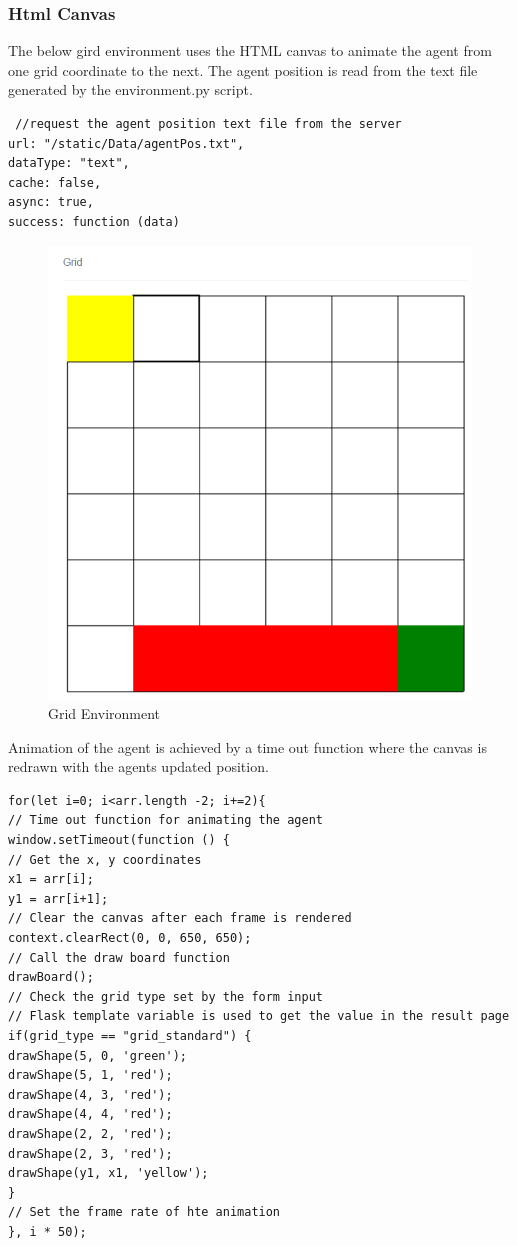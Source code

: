 \subsubsection{Html Canvas}
The below gird environment uses the HTML canvas to animate the agent from one grid coordinate to the next. The agent position is read from the text file generated by the environment.py script.
\begin{verbatim}
 //request the agent position text file from the server
url: "/static/Data/agentPos.txt",
dataType: "text",
cache: false,
async: true,
success: function (data)
\end{verbatim}
\begin{figure}[H]
	\centering
	\includegraphics[width=.7\linewidth]{img/grid}
	\caption{Grid Environment}
	\label{fig:grid}
\end{figure}
Animation of the agent is achieved by a time out function where the canvas is redrawn with the agents updated position.
\begin{verbatim}
for(let i=0; i<arr.length -2; i+=2){
// Time out function for animating the agent
window.setTimeout(function () {
// Get the x, y coordinates
x1 = arr[i];
y1 = arr[i+1];
// Clear the canvas after each frame is rendered
context.clearRect(0, 0, 650, 650);
// Call the draw board function
drawBoard();
// Check the grid type set by the form input
// Flask template variable is used to get the value in the result page
if(grid_type == "grid_standard") {
drawShape(5, 0, 'green');
drawShape(5, 1, 'red');
drawShape(4, 3, 'red');
drawShape(4, 4, 'red');
drawShape(2, 2, 'red');
drawShape(2, 3, 'red');
drawShape(y1, x1, 'yellow');
}
// Set the frame rate of hte animation
}, i * 50);
\end{verbatim}
